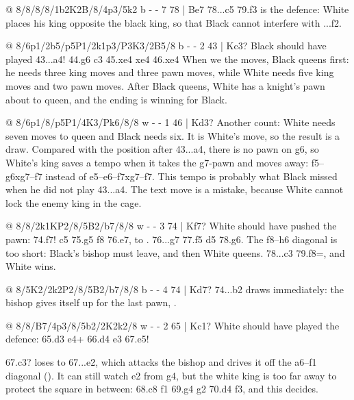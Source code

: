 @ 8/8/8/8/1b2K2B/8/4p3/5k2 b - - 7 78 | Be7
78...\B c5 79.\K f3 is the  defence: White places his king opposite the black
king, so that Black cannot interfere with ...\B f2.

@ 8/6p1/2b5/p5P1/2k1p3/P3K3/2B5/8 b - - 2 43 | Kc3?
Black should have played 43...a4! 44.g6 \K c3 45.\B xe4 \B xe4 46.\K xe4
When we  the moves, Black queens first: he needs three
king moves and three pawn moves, while White needs five king moves and two pawn moves. After Black
queens, White has a knight's pawn about to queen, and the ending is winning for Black.

@ 8/6p1/8/p5P1/4K3/Pk6/8/8 w - - 1 46 | Kd3?
Another count: White needs seven moves to queen and Black needs six. It is White's move, so the
result is a draw. Compared with the position after 43...a4, there is no pawn on g6, so White's king
saves a tempo when it takes the g7-pawn and moves away: \K f5--g6xg7--f7 instead of
\K e5--e6--f7xg7--f7. This tempo is probably what Black missed when he did not play 43...a4.
The text move is a mistake, because White cannot lock the enemy king in the cage.

@ 8/8/2k1KP2/8/5B2/b7/8/8 w - - 3 74 | Kf7?
White should have pushed the pawn: 74.f7! \B c5 75.\B g5 \B f8 76.\B e7, to
. 76...\B g7
77.\K f5 \K d5 78.\K g6. The f8--h6 diagonal is too short: Black's bishop must leave, and then White
queens. 78...\B c3 79.f8=\Q{}, and White wins.

@ 8/5K2/2k2P2/8/5B2/b7/8/8 b - - 4 74 | Kd7?
74...\B b2 draws immediately: the bishop gives itself up for the last pawn,
.

@ 8/8/B7/4p3/8/5b2/2K2k2/8 w - - 2 65 | Kc1?
White should have played the
 defence: 65.\K d3 e4+ 66.\K d4 e3 67.\K e5!

67.\K c3? loses to 67...\B e2, which attacks the bishop and drives it off the a6--f1 diagonal
(). It can still watch e2 from g4, but the white king is
too far away to protect the square in between: 68.\B c8 \B f1 69.\B g4 \B g2 70.\K d4 \B f3, and
this  decides.

